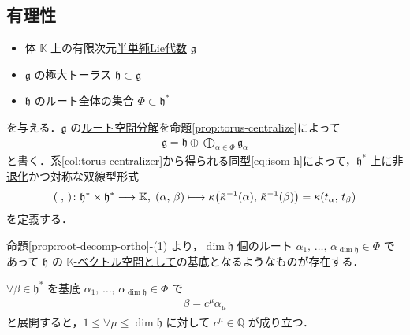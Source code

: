 \documentclass[rep_main]{subfiles}
\begin{document}
\subsection{有理性}

\begin{itemize}
	\item 体 $\mathbb{K}$ 上の有限次元\hyperref[def:semisimple-LieAlg]{半単純Lie代数} $\mathfrak{g}$
	\item $\mathfrak{g}$ の\hyperref[def:toral-subLieAlg]{極大トーラス} $\mathfrak{h} \subset \mathfrak{g}$
	\item $\mathfrak{h}$ のルート全体の集合 $\Phi \subset \mathfrak{h}^*$ 
\end{itemize}
を与える．$\mathfrak{g}$ の\hyperref[eq:root-decomp]{ルート空間分解}を命題\ref{prop:torus-centralize}によって
\begin{align}
	\mathfrak{g} = \mathfrak{h} \oplus \bigoplus_{\alpha \in \Phi} \mathfrak{g}_\alpha
\end{align}
と書く．系\ref{col:torus-centralizer}から得られる同型\eqref{eq:isom-h}によって，$\mathfrak{h}^*$ 上に\hyperref[def:radical-bilinear]{非退化}かつ対称な双線型形式
\begin{align}
	(\; ,\, ) \colon \mathfrak{h}^* \times \mathfrak{h}^* \longrightarrow \mathbb{K},\; (\alpha,\, \beta) \longmapsto \kappa\bigl(\tilde{\kappa}^{-1}(\alpha),\, \tilde{\kappa}^{-1}(\beta)\bigr) = \kappa(t_\alpha,\, t_\beta)
\end{align}
を定義する．

命題\ref{prop:root-decomp-ortho}-(1) より，$\dim \mathfrak{h}$ 個のルート $\alpha_1,\, \dots,\, \alpha_{\dim \mathfrak{h}} \in \Phi$ であって $\mathfrak{h}$ の \underline{$\mathbb{K}$-ベクトル空間として}の基底となるようなものが存在する．

\begin{mylem}[label=lem:root-Q]{}
	$\forall \beta \in \mathfrak{h}^*$ を基底 $\alpha_1,\, \dots,\, \alpha_{\dim \mathfrak{h}} \in \Phi$ で
	\begin{align}
		\beta = c^\mu \alpha_\mu
	\end{align}
	と展開すると，$1 \le \forall \mu \le \dim \mathfrak{h}$ に対して $c^\mu \in \mathbb{Q}$ が成り立つ．
\end{mylem}
\end{document}
